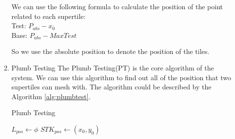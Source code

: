 \documentclass[preprint,natbib,10pt]{article}
\begin{document}
\begin{enumerate}
\begin{enumerate}
We can use the following formula to calculate the position of  the point related to each supertile:\\
Test: $P_{abs} - x_0$\\
Base: $P_{abs} - MaxTest$

So we use the absolute position to denote the position of the tiles.

 \item Plumb Testing
The Plumb Testing(PT) is the core algorithm of the system. We can use this algorithm to find out all of the position that two supertiles can mesh with. The algorithm could be described by the Algorithm \ref{alg:plumbtest}.

\begin{algorithm}
\caption{Plumb Testing} \label{alg:plumbtest}
\linesnumberedhidden


    $L_{pos} \gets \phi $ \;
    $STK_{pos} \gets (x_0,y_0) $ 


\end{algorithm}
\end{enumerate}
\end{enumerate}
\end{document}
